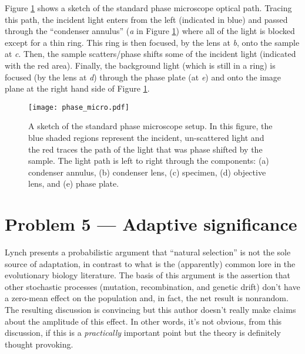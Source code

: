\documentclass[11pt]{article}
\newcommand{\Fig}[1]{Figure \ref{fig:#1}}
\newcommand{\fig}[1]{Figure \ref{fig:#1}}
\newcommand{\figlabel}[1]{\label{fig:#1}}
\begin{document}
\Fig{phase-micro} shows a sketch of the standard phase microscope optical
path.
Tracing this path, the incident light enters from the left (indicated in blue)
and passed through the ``condenser annulus'' (\emph{a} in \fig{phase-micro})
where all of the light is blocked except for a thin ring.
This ring is then focused, by the lens at \emph{b}, onto the sample at
\emph{c}.
Then, the sample scatters/phase shifts some of the incident light (indicated
with the red area).
Finally, the background light (which is still in a ring) is focused (by the
lens at \emph{d}) through the phase plate (at \emph{e}) and onto the image
plane at the right hand side of \fig{phase-micro}.

\begin{figure}[htbp]
\begin{center}
\texttt{[image: phase\_micro.pdf]}
\end{center}
\caption{A sketch of the standard phase microscope setup.
In this figure, the blue shaded regions represent the incident, un-scattered
light and the red traces the path of the light that was phase shifted by the
sample.
The light path is left to right through the components:
(a) condenser annulus,
(b) condenser lens,
(c) specimen,
(d) objective lens, and
(e) phase plate.
\figlabel{phase-micro}}
\end{figure}


\section{Problem 5 --- Adaptive significance}

Lynch \cite{lynch} presents a probabilistic argument that ``natural
selection'' is not the sole source of adaptation, in contrast to what is the
(apparently) common lore in the evolutionary biology literature.
The basis of this argument is the assertion that other stochastic processes
(mutation, recombination, and genetic drift) don't have a zero-mean effect on
the population and, in fact, the net result is nonrandom.
The resulting discussion is convincing but this author doesn't really make
claims about the amplitude of this effect.
In other words, it's not obvious, from this discussion, if this is a
\emph{practically} important point but the theory is definitely thought
provoking.
\end{document}
